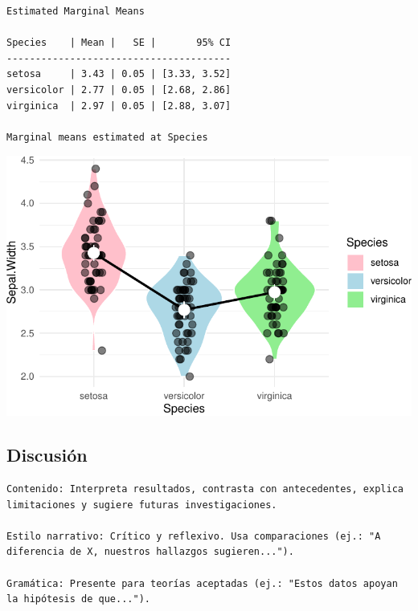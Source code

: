 \documentclass[
]{article}
\begin{document}
\begin{verbatim}
Estimated Marginal Means

Species    | Mean |   SE |       95% CI
---------------------------------------
setosa     | 3.43 | 0.05 | [3.33, 3.52]
versicolor | 2.77 | 0.05 | [2.68, 2.86]
virginica  | 2.97 | 0.05 | [2.88, 3.07]

Marginal means estimated at Species
\end{verbatim}

\includegraphics{template_files/figure-pdf/unnamed-chunk-12-1.pdf}

\subsection{Discusión}\label{discusiuxf3n}

\begin{tcolorbox}[enhanced jigsaw, leftrule=.75mm, title=\textcolor{quarto-callout-tip-color}{\faLightbulb}\hspace{0.5em}{Tip}, breakable, toptitle=1mm, colbacktitle=quarto-callout-tip-color!10!white, rightrule=.15mm, coltitle=black, bottomtitle=1mm, titlerule=0mm, left=2mm, colframe=quarto-callout-tip-color-frame, colback=white, arc=.35mm, bottomrule=.15mm, toprule=.15mm, opacitybacktitle=0.6, opacityback=0]

\begin{verbatim}
Contenido: Interpreta resultados, contrasta con antecedentes, explica limitaciones y sugiere futuras investigaciones.

Estilo narrativo: Crítico y reflexivo. Usa comparaciones (ej.: "A diferencia de X, nuestros hallazgos sugieren...").

Gramática: Presente para teorías aceptadas (ej.: "Estos datos apoyan la hipótesis de que...").
\end{verbatim}

\end{tcolorbox}
\end{document}
